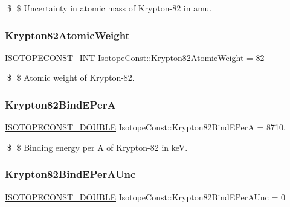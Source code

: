 \$ \$ Uncertainty in atomic mass of Krypton-\/82 in amu. \mbox{\label{group___isotope_const-_krypton-_kr82_ga2955570bd3bc2b97920b991f72de5fa6}} 
\subsubsection{\texorpdfstring{Krypton82\+Atomic\+Weight}{Krypton82AtomicWeight}}
{\footnotesize\ttfamily \mbox{\hyperlink{group___isotope_const-_macros_ga5f18360b3e99483a35c32d789e62621c}{I\+S\+O\+T\+O\+P\+E\+C\+O\+N\+S\+T\+\_\+\+I\+NT}} Isotope\+Const\+::\+Krypton82\+Atomic\+Weight = 82}

\$ \$ Atomic weight of Krypton-\/82. \mbox{\label{group___isotope_const-_krypton-_kr82_gac372ac3bb39895fdea0c0dad39913d8b}} 
\subsubsection{\texorpdfstring{Krypton82\+Bind\+E\+PerA}{Krypton82BindEPerA}}
{\footnotesize\ttfamily \mbox{\hyperlink{group___isotope_const-_macros_ga8f45a7272ce02c0b4c65c44636ed719a}{I\+S\+O\+T\+O\+P\+E\+C\+O\+N\+S\+T\+\_\+\+D\+O\+U\+B\+LE}} Isotope\+Const\+::\+Krypton82\+Bind\+E\+PerA = 8710.}

\$ \$ Binding energy per A of Krypton-\/82 in keV. \mbox{\label{group___isotope_const-_krypton-_kr82_gaebef25ae822a43a20641e7880edc0e12}} 
\subsubsection{\texorpdfstring{Krypton82\+Bind\+E\+Per\+A\+Unc}{Krypton82BindEPerAUnc}}
{\footnotesize\ttfamily \mbox{\hyperlink{group___isotope_const-_macros_ga8f45a7272ce02c0b4c65c44636ed719a}{I\+S\+O\+T\+O\+P\+E\+C\+O\+N\+S\+T\+\_\+\+D\+O\+U\+B\+LE}} Isotope\+Const\+::\+Krypton82\+Bind\+E\+Per\+A\+Unc = 0}

